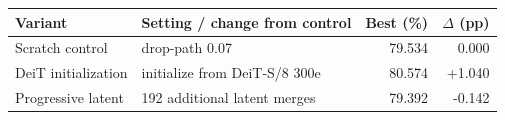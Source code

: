 \begin{tabular}{llrr}
\toprule
Variant & Setting / change from control & Best (\%) & $\Delta$ (pp) \\
\midrule
Scratch control & drop-path 0.07 & 79.534 & 0.000 \\
DeiT initialization & initialize from DeiT-S/8 300e & 80.574 & +1.040 \\
Progressive latent & 192 additional latent merges & 79.392 & -0.142 \\
\bottomrule
\end{tabular}

